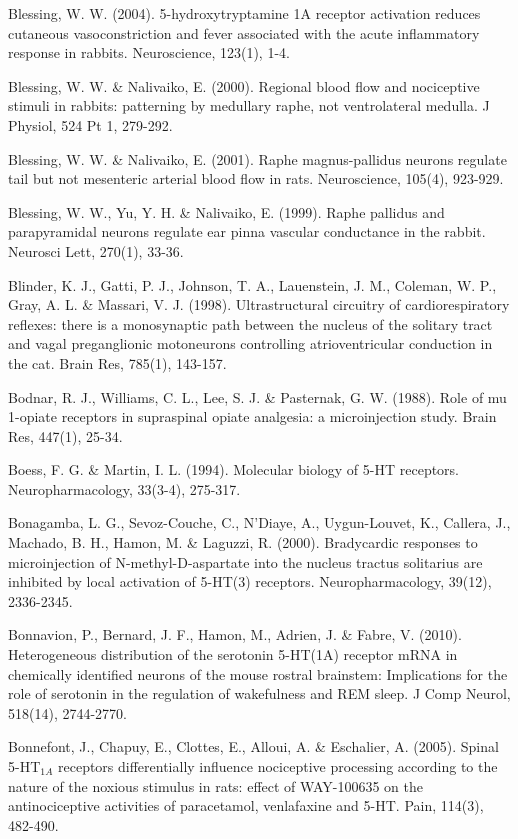 \documentclass[a4paper,12pt,twoside]{report}
\begin{document}
\begin{singlespacing}
\begin{footnotesize}
Blessing, W. W. (2004). 5-hydroxytryptamine 1A receptor activation reduces cutaneous vasoconstriction and fever associated with the acute inflammatory response in rabbits. Neuroscience, 123(1), 1-4.

Blessing, W. W. \& Nalivaiko, E. (2000). Regional blood flow and nociceptive stimuli in rabbits: patterning by medullary raphe, not ventrolateral medulla. J Physiol, 524 Pt 1, 279-292.

Blessing, W. W. \& Nalivaiko, E. (2001). Raphe magnus-\linebreak pallidus neurons regulate tail but not mesenteric arterial blood flow in rats. Neuroscience, 105(4), 923-929.

Blessing, W. W., Yu, Y. H. \& Nalivaiko, E. (1999). Raphe pallidus and parapyramidal neurons regulate ear pinna vascular conductance in the rabbit. Neurosci Lett, 270(1), 33-36.

Blinder, K. J., Gatti, P. J., Johnson, T. A., Lauenstein, J. M., Coleman, W. P., Gray, A. L. \& Massari, V. J. (1998). Ultrastructural circuitry of cardiorespiratory reflexes: there is a monosynaptic path between the nucleus of the solitary tract and vagal preganglionic motoneurons controlling atrioventricular conduction in the cat. Brain Res, 785(1), 143-157.

Bodnar, R. J., Williams, C. L., Lee, S. J. \& Pasternak, G. W. (1988). Role of mu 1-opiate receptors in supraspinal opiate analgesia: a microinjection study. Brain Res, 447(1), 25-34.

Boess, F. G. \& Martin, I. L. (1994). Molecular biology of 5-HT receptors. Neuropharmacology, 33(3-4), 275-317.

Bonagamba, L. G., Sevoz-Couche, C., N'Diaye, A., Uygun-Louvet, K., Callera, J., Machado, B. H., Hamon, M. \& Laguzzi, R. (2000). Bradycardic responses to microinjection of N-methyl-D-aspartate into the nucleus tractus solitarius are inhibited by local activation of 5-HT(3) receptors. Neuropharmacology, 39(12), 2336-2345.

Bonnavion, P., Bernard, J. F., Hamon, M., Adrien, J. \& Fabre, V. (2010). Heterogeneous distribution of the serotonin 5-HT(1A) receptor mRNA in chemically identified neurons of the mouse rostral brainstem: Implications for the role of serotonin in the regulation of wakefulness and REM sleep. J Comp Neurol, 518(14), 2744-2770.

Bonnefont, J., Chapuy, E., Clottes, E., Alloui, A. \& Eschalier, A. (2005). Spinal 5-HT$_{1A}$ receptors differentially influence nociceptive processing according to the nature of the noxious stimulus in rats: effect of WAY-100635 on the antinociceptive activities of paracetamol, venlafaxine and 5-HT. Pain, 114(3), 482-490.


\end{footnotesize}
\end{singlespacing}
\end{document}
